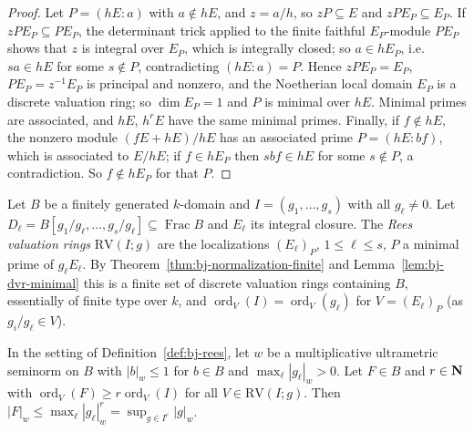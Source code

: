 \begin{proof}
Let $P=(hE:a)$ with $a\notin hE$, and $z=a/h$, so $zP\subseteq E$ and $zPE_P\subseteq E_P$. If
$zPE_P\subseteq PE_P$, the determinant trick applied to the finite faithful $E_P$-module $PE_P$ shows that $z$
is integral over $E_P$, which is integrally closed; so $a\in hE_P$, i.e.\ $sa\in hE$ for some $s\notin P$,
contradicting $(hE:a)=P$. Hence $zPE_P=E_P$, $PE_P=z^{-1}E_P$ is principal and nonzero, and the
Noetherian local domain $E_P$ is a discrete valuation ring; so $\dim E_P=1$ and $P$ is minimal over $hE$.
Minimal primes are associated, and $hE$, $h^rE$ have the same minimal primes. Finally, if $f\notin hE$,
the nonzero module $(fE+hE)/hE$ has an associated prime $P=(hE:bf)$, which is associated to $E/hE$; if
$f\in hE_P$ then $sbf\in hE$ for some $s\notin P$, a contradiction. So $f\notin hE_P$ for that $P$.
\end{proof}

\begin{definition}\label{def:bj-rees}
\leanok
{}
Let $B$ be a finitely generated $k$-domain and $I=(g_1,\dots,g_s)$ with all $g_\ell\ne0$. Let
$D_\ell=B[g_1/g_\ell,\dots,g_s/g_\ell]\subseteq\operatorname{Frac}B$ and $E_\ell$ its integral closure. The
\emph{Rees valuation rings} $\mathrm{RV}(I;g)$ are the localizations $(E_\ell)_P$, $1\le\ell\le s$, $P$ a
minimal prime of $g_\ell E_\ell$. By Theorem~\ref{thm:bj-normalization-finite} and
Lemma~\ref{lem:bj-dvr-minimal} this is a finite set of discrete valuation rings containing $B$, essentially
of finite type over $k$, and $\operatorname{ord}_V(I)=\operatorname{ord}_V(g_\ell)$ for $V=(E_\ell)_P$ (as $g_i/g_\ell\in V$).
\end{definition}

\begin{theorem}\label{thm:bj-rees}
\leanok
{}
In the setting of Definition~\ref{def:bj-rees}, let $w$ be a multiplicative ultrametric seminorm on $B$ with
$|b|_w\le1$ for $b\in B$ and $\max_\ell|g_\ell|_w>0$. Let $F\in B$ and $r\in\mathbf{N}$ with
$\operatorname{ord}_V(F)\ge r\operatorname{ord}_V(I)$ for all $V\in\mathrm{RV}(I;g)$. Then $|F|_w\le\max_\ell|g_\ell|_w^r
=\sup_{g\in I^r}|g|_w$.
\end{theorem}

